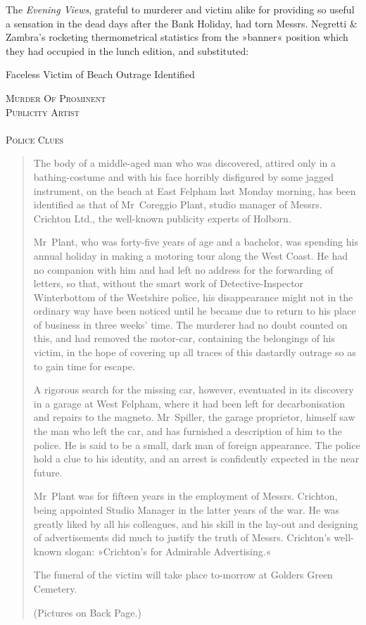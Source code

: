 The \textit{Evening Views}, grateful to murderer and victim alike for providing so useful a sensation in the dead days after the Bank Holiday, had torn Messrs. Negretti \& Zambra's rocketing thermometrical statistics from the »banner« position which they had occupied in the lunch edition, and substituted:
\begin{center}
Faceless Victim of Beach Outrage Identified

\textsc{Murder Of Prominent\\
Publicity Artist\\
~\\
Police Clues}
\end{center}

\begin{quotation}
The body of a middle-aged man who was discovered, attired only in a bathing-costume and with his face horribly disfigured by some jagged instrument, on the beach at East Felpham last Monday morning, has been identified as that of Mr~Coreggio Plant, studio manager of Messrs. Crichton Ltd., the well-known publicity experts of Holborn.

Mr~Plant, who was forty-five years of age and a bachelor, was spending his annual holiday in making a motoring tour along the West Coast. He had no companion with him and had left no address for the forwarding of letters, so that, without the smart work of Detective-Inspector Winterbottom of the Westshire police, his disappearance might not in the ordinary way have been noticed until he became due to return to his place of business in three weeks' time. The murderer had no doubt counted on this, and had removed the motor-car, containing the belongings of his victim, in the hope of covering up all traces of this dastardly outrage so as to gain time for escape.

A rigorous search for the missing car, however, eventuated in its discovery in a garage at West Felpham, where it had been left for decarbonisation and repairs to the magneto. Mr~Spiller, the garage proprietor, himself saw the man who left the car, and has furnished a description of him to the police. He is said to be a small, dark man of foreign appearance. The police hold a clue to his identity, and an arrest is confidently expected in the near future.

Mr~Plant was for fifteen years in the employment of Messrs. Crichton, being appointed Studio Manager in the latter years of the war. He was greatly liked by all his colleagues, and his skill in the lay-out and designing of advertisements did much to justify the truth of Messrs. Crichton's well-known slogan: »Crichton's for Admirable Advertising.«

The funeral of the victim will take place to-morrow at Golders Green Cemetery.

(Pictures on Back Page.)
\end{quotation}

